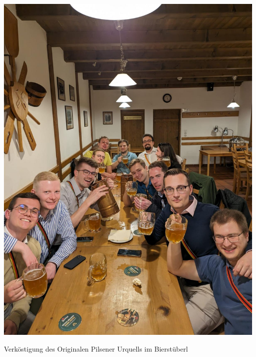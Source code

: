 \begin{center}
\begin{figurehere}
  \includegraphics[width=.7\linewidth]{./Bilder/1.5BackToTheRootsAktivenfahrtPrag/2.bild.jpeg} 
  \caption{Verköstigung des Originalen Pilsener Urquells im Bierstüberl}
\end{figurehere}
\end{center}

	\newpage

